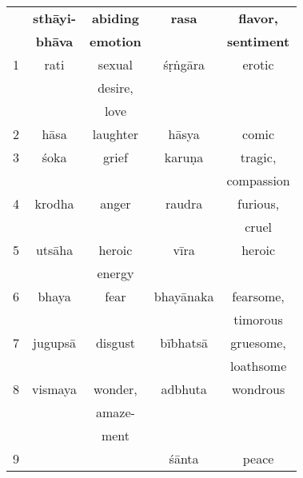 \documentclass[10pt]{article}
\begin{document}
\setlength{\columnsep}{3em}
\begin{multicols}{2}
	\hspace*{-9mm}
	\begin{tabular}{|c||c|c||c|c|}
		\hline
		  & \textbf{sthāyi-} & \textbf{abiding} & \textbf{rasa} & \textbf{flavor,}   \\
		  & \textbf{bhāva}   & \textbf{emotion} &               & \textbf{sentiment} \\
		\hline
		1 & rati             & sexual           & śṛṅgāra       & erotic             \\
		  &                  & desire,          &               &                    \\
		  &                  & love             &               &                    \\
		\hline
		2 & hāsa             & laughter         & hāsya         & comic              \\
		\hline
		3 & śoka             & grief            & karuṇa        & tragic,            \\
		  &                  &                  &               & compassion         \\
		\hline
		4 & krodha           & anger            & raudra        & furious,           \\
		  &                  &                  &               & cruel              \\
		\hline
		5 & utsāha           & heroic           & vīra          & heroic             \\
		  &                  & energy           &               &                    \\
		\hline
		6 & bhaya            & fear             & bhayānaka     & fearsome,          \\
		  &                  &                  &               & timorous           \\
		\hline
		7 & jugupsā          & disgust          & bībhatsā      & gruesome,          \\
		  &                  &                  &               & loathsome          \\
		\hline
		8 & vismaya          & wonder,          & adbhuta       & wondrous           \\
		  &                  & amaze-           &               &                    \\
		  &                  & ment             &               &                    \\
		\hline
		9 &                  &                  & śānta         & peace              \\
		\hline
	\end{tabular}


\end{multicols}
\end{document}
